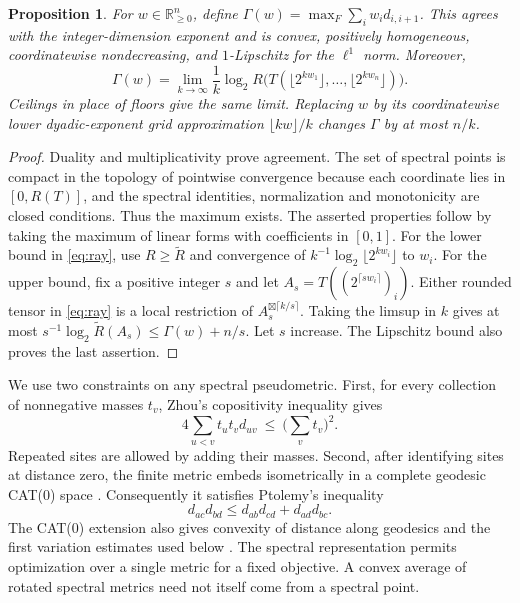 \documentclass[11pt,a4paper]{article}
\newtheorem{proposition}[theorem]{Proposition}
\theoremstyle{definition}
\newcommand{\Rtil}{\widetilde R}
\begin{document}
\begin{proposition}\label{prop:real}
For \(w\in\mathbb R_{\ge0}^n\), define \(\Gamma(w)=\max_F\sum_i w_i d_{i,i+1}\).
This agrees with the integer-dimension exponent and is convex, positively homogeneous, coordinatewise nondecreasing, and \(1\)-Lipschitz for the \(\ell^1\) norm. Moreover,
\begin{equation}\label{eq:ray}
 \Gamma(w)=\lim_{k\to\infty}\frac1k
   \log_2 R\bigl(T(\lfloor2^{kw_1}\rfloor,\ldots,\lfloor2^{kw_n}\rfloor)\bigr).
\end{equation}
Ceilings in place of floors give the same limit. Replacing \(w\) by its coordinatewise lower dyadic-exponent grid approximation \(\lfloor kw\rfloor/k\) changes \(\Gamma\) by at most \(n/k\).
\end{proposition}
\begin{proof}
Duality and multiplicativity prove agreement. The set of spectral points is compact in the topology of pointwise convergence because each coordinate lies in \([0,R(T)]\), and the spectral identities, normalization and monotonicity are closed conditions. Thus the maximum exists. The asserted properties follow by taking the maximum of linear forms with coefficients in \([0,1]\). For the lower bound in \eqref{eq:ray}, use \(R\ge\Rtil\) and convergence of \(k^{-1}\log_2\lfloor2^{kw_i}\rfloor\) to \(w_i\). For the upper bound, fix a positive integer \(s\) and let \(A_s=T((2^{\lceil s w_i\rceil})_i)\). Either rounded tensor in \eqref{eq:ray} is a local restriction of \(A_s^{\boxtimes\lceil k/s\rceil}\). Taking the limsup in \(k\) gives at most \(s^{-1}\log_2\Rtil(A_s)\le\Gamma(w)+n/s\). Let \(s\) increase. The Lipschitz bound also proves the last assertion.
\end{proof}

We use two constraints on any spectral pseudometric. First, for every collection of nonnegative masses \(t_v\), Zhou's copositivity inequality gives \cite[Lemma 5.1]{Zhou}
\begin{equation}\label{eq:cp-main}
 4\sum_{u<v} t_ut_vd_{uv}\ \le\ \Big(\sum_vt_v\Big)^2 .
\end{equation}
Repeated sites are allowed by adding their masses. Second, after identifying sites at distance zero, the finite metric embeds isometrically in a complete geodesic CAT(0) space \cite[Theorem 4.3]{CAT}. Consequently it satisfies Ptolemy's inequality \cite{Ptolemy}
\begin{equation}\label{eq:pt-main}
 d_{ac}d_{bd}\le d_{ab}d_{cd}+d_{ad}d_{bc}.
\end{equation}
The CAT(0) extension also gives convexity of distance along geodesics and the first variation estimates used below \cite{BH}. The spectral representation permits optimization over a single metric for a fixed objective. A convex average of rotated spectral metrics need not itself come from a spectral point.
\end{document}
